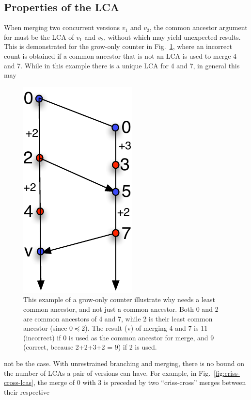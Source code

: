 \subsection{Properties of the LCA}
\label{sec:meta}

When merging two concurrent versions $v_1$ and $v_2$, the common
ancestor argument for  must be the LCA of $v_1$ and $v_2$,
without which  may yield unexpected results. This is
demonstrated for the grow-only counter in
Fig.~\ref{fig:merge-needs-lca}, where an incorrect count is obtained if a
common ancestor that is not an LCA is used to merge 4 and 7. While in
this example there is a unique LCA for 4 and 7, in general this may
\begin{figure}
\centering
\includegraphics[scale=0.6]{Figures/merge-needs-lca}
\caption{This example of a grow-only counter illustrate why 
needs a least common ancestor, and not just a common ancestor. Both 0
and 2 are common ancestors of 4 and 7, while 2 is their least common
ancestor (since $0 \preceq 2$). The result (v) of merging 4 and 7 is
11 (incorrect) if 0 is used as the common ancestor for merge, and 9
(correct, because 2+2+3+2 = 9) if 2 is used. }
\label{fig:merge-needs-lca}
\end{figure}
not be the case. With unrestrained branching and merging, there is no
bound on the number of LCAs a pair of versions can have.  For example,
in Fig.~\ref{fig:criss-cross-lcas}, the merge of 0 with 3 is preceded
by two ``criss-cross'' merges between their respective
